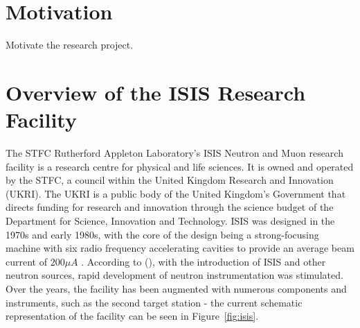 \documentclass[10pt,oneside]{report}
\begin{document}

\textbf{ }


\section{Motivation}
Motivate the research project.




\section{Overview of the ISIS Research Facility}\label{sec:isisbg}

The STFC Rutherford Appleton Laboratory's ISIS Neutron and Muon research facility is a research centre for physical and life sciences. It is owned and operated by the STFC, a council within the United Kingdom Research and Innovation (UKRI). The UKRI is a public body of the United Kingdom's Government that directs funding for research and innovation through the science budget of the Department for Science, Innovation and Technology. ISIS was designed in the 1970s and early 1980s, with the core of the design being a strong-focusing machine with six radio frequency accelerating cavities to provide an average beam current of $200\mu A$ \cite{thomason2019isis}. According to (\citet{thomason2019isis}), with the introduction of ISIS and other neutron sources, rapid development of neutron instrumentation was stimulated. Over the years, the facility has been augmented with numerous components and instruments, such as the second target station - the current schematic representation of the facility can be seen in Figure~\ref{fig:isis}.
\end{document}
